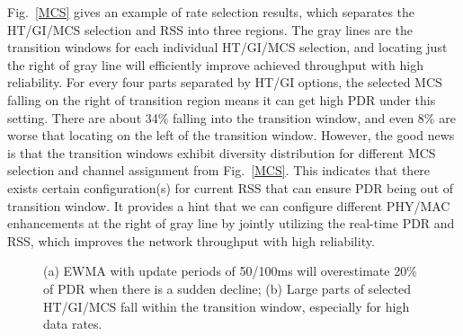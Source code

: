 \documentclass[draftclsnofoot,journal,onecolumn,11pt]{IEEEtran}
\begin{document}
Fig.~\ref{MCS} gives an example of rate selection results, which separates the HT/GI/MCS selection and RSS into three regions. The gray lines are the transition windows for each individual HT/GI/MCS selection, and locating just the right of gray line will efficiently improve achieved throughput with high reliability. For every four parts separated by HT/GI options, the selected MCS falling on the right of transition region means it can get high PDR under this setting. There are about 34\% falling into the transition window, and even 8\% are worse that locating on the left of the transition window. However, the good news is that the transition windows exhibit diversity distribution for different MCS selection and channel assignment from Fig.~\ref{MCS}. This indicates that there exists certain configuration(s) for current RSS that can ensure PDR being out of transition window. It provides a hint that we can configure different PHY/MAC enhancements at the right of gray line by jointly utilizing the real-time PDR and RSS, which improves the network throughput with high reliability.

\begin{figure}[!t]
\centerline{
}
\caption{(a) EWMA with update periods of 50/100ms will overestimate 20\% of PDR when there is a sudden decline; (b) Large parts of selected HT/GI/MCS fall within the transition window, especially for high data rates.}
\label{pdr-rss}
\end{figure}
\end{document}
